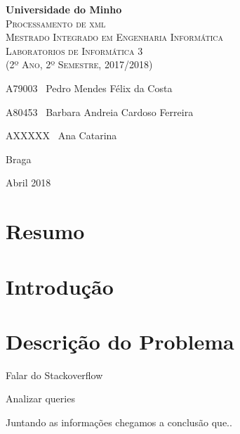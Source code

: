 \documentclass[11pt,a4paper]{report}
\begin{document}
\begin{titlepage}
    \center
    \vspace*{4.0cm}
    {\huge {\bf Universidade do Minho}}\\[0.4cm]
    \vspace{3.0cm}
    \textsc{\huge{Processamento de xml}}\\[0.5cm] %
    \vspace{3.0cm}
    \textsc{\huge{Mestrado Integrado em Engenharia Informática}}\\[0.5cm]
    \vspace{2.0cm}
    \textsc{Laboratorios de Informática 3}\\[0.5cm]
    \textsc{(2º Ano, 2º Semestre, 2017/2018)}\\[0.5cm]
    \vspace{1.5cm}
    \begin{flushleft}
        A79003 \,\,\,Pedro Mendes Félix da Costa
        \vspace{0.2cm}

        A80453 \,\,\,Barbara Andreia Cardoso Ferreira
        \vspace{0.2cm}

        AXXXXX \,\,\,Ana Catarina %
    \end{flushleft}
        \vspace{1cm}
    \begin{flushright}
        Braga

        Abril 2018
    \end{flushright}

\end{titlepage}

\chapter{Resumo}


\tableofcontents %

\chapter{Introdução}


\chapter{Descrição do Problema}
    Falar do Stackoverflow

    Analizar queries


    Juntando as informações chegamos a conclusão que..
\end{document}
